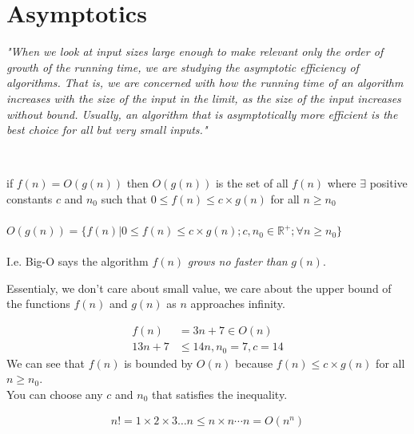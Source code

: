 \section{Asymptotics}
\begin{remark}
    \textit{"When we look at input sizes large enough to make relevant only the
        order of growth of the running time, we are studying the asymptotic
        efficiency of algorithms. That is, we are concerned with how the running
        time of an algorithm increases with the size of the input in the limit, as
        the size of the input increases without bound. Usually, an algorithm
        that is asymptotically more efficient is the best choice for all but very
        small inputs."}
\end{remark}
\
\begin{theorem}
    if $f(n) = O(g(n))$ then $O(g(n))$ is the set of all $f(n)$ where $\exists$ positive constants $c$ and $n_0$ such that $0 \leq f(n) \leq c\times g(n)$ for all $n \geq n_0$ \\\\
    $O(g(n)) = \{f(n) | 0 \leq f(n) \leq c\times g(n); c, n_0 \in \mathbb{R}^+; \forall n \geq n_0 \}$ \\\\
    I.e. Big-O says the algorithm $f(n)$ \textit{grows no faster than} $g(n)$.
\end{theorem}


Essentialy, we don't care about small value, we care about the upper bound of the functions $f(n)$ and $g(n)$ as $n$ approaches infinity.

\begin{example}
    \begin{align*}
        f(n)    & = 3n + 7 \in O(n)         \\
        13n + 7 & \leq 14n, n_0 = 7, c = 14
    \end{align*}
    We can see that $f(n)$ is bounded by $O(n)$ because $f(n) \leq c\times g(n)$ for all $n \geq n_0$. \\
    You can choose any $c$ and $n_0$ that satisfies the inequality.
\end{example}

\begin{example}
    \begin{align*}
        n! = 1\times 2 \times 3 \ldots n \leq n \times n \cdots n = O(n^n) \\
    \end{align*}
\end{example}

